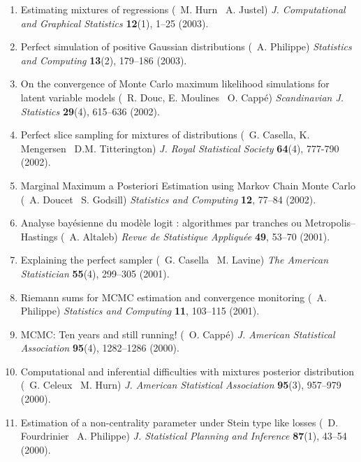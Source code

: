 \begin{enumerate}
\item Estimating mixtures of regressions (\avec\  M. Hurn \et\ A. Justel) 
{\it J. Computational and Graphical Statistics} {\bf 12}(1), 1--25 (2003).

\item Perfect simulation of positive Gaussian distributions
(\avec\ A. Philippe) {\it Statistics and Computing} {\bf 13}(2), 179--186 (2003).

\item On the convergence of Monte Carlo maximum likelihood simulations
for latent variable models (\avec\ R. Douc, E. Moulines \et\ O. Capp\'e)
{\it Scandinavian J. Statistics} {\bf 29}(4), 615--636 (2002).

\item Perfect slice sampling for mixtures of distributions
(\avec\ G. Casella, K. Mengersen \et\ D.M. Titterington) {\it 
J. Royal Statistical Society} {\bf 64}(4), 777-790 (2002).

\item Marginal Maximum a Posteriori Estimation using Markov Chain Monte Carlo
(\avec\  A. Doucet \et\ S. Godsill) 
{\it Statistics and Computing} {\bf 12}, 77--84 (2002).

\item Analyse bay\'esienne du mod\`ele logit : algorithmes par
tranches ou Metropolis--Hastings (\avec\ A. Altaleb) 
{\it Revue de Statistique Appliqu\'ee} {\bf 49}, 53--70 (2001). 

\item Explaining the perfect sampler (\avec\ G. Casella \et\ M. Lavine)
{\it The American Statistician} {\bf 55}(4), 299--305 (2001).

\item Riemann sums for MCMC estimation and
convergence monitoring (\avec\ A. Philippe)
{\it Statistics and Computing} {\bf 11}, 103--115 (2001).

\item MCMC: Ten years and still running! 
(\avec\ O. Capp\'e) {\it J. American Statistical Association} 
{\bf 95}(4), 1282--1286 (2000).

\item Computational and inferential difficulties with mixtures posterior distribution
(\avec\ G. Celeux \et\ M. Hurn) 
{\it J. American Statistical Association} {\bf 95}(3), 957--979 (2000).

\item Estimation of a non-centrality parameter under Stein type 
like losses (\avec\ D. Fourdrinier \et\ A. Philippe) 
{\it J. Statistical Planning and Inference} {\bf 87}(1), 43--54 (2000).


\end{enumerate}
